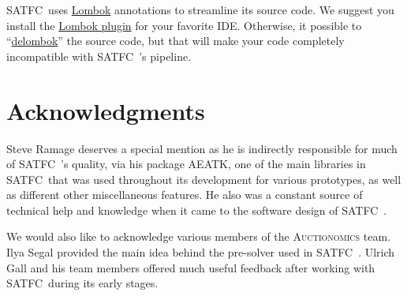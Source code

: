 \documentclass[
10pt, %
letterpaper, %
oneside, %
headinclude,footinclude, %
BCOR5mm, %
needspace, %
]{scrartcl}
\newcommand{\SATFC}{\textsc{SATFC}~}
\newcommand{\AEATK}{\textsc{AEATK}}
\begin{document}
\SATFC uses \href{http://projectlombok.org/}{Lombok} annotations to streamline its source code. We suggest you install the \href{http://projectlombok.org/download.html}{Lombok plugin} for your favorite IDE. Otherwise, it possible to ``\href{http://projectlombok.org/features/delombok.html}{delombok}'' the source code, but that will make your code completely incompatible with \SATFC's pipeline.

\section{Acknowledgments} 

Steve Ramage deserves a special mention as he is indirectly responsible for much of \SATFC's quality, via his package \AEATK, one of the main libraries in \SATFC that was used throughout its development for various prototypes, as well as different other miscellaneous features. He also was a constant source of technical help and knowledge when it came to the software design of \SATFC.

We would also like to acknowledge various members of the \textsc{Auctionomics} team. Ilya Segal provided the main idea behind the pre-solver used in \SATFC. Ulrich Gall and his team members offered much useful feedback after working with \SATFC during its early stages.
\end{document}
